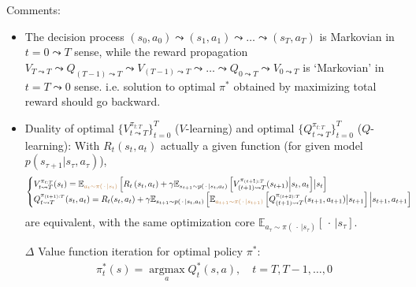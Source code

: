 Comments:
\begin{itemize}[topsep=2pt,itemsep=0pt]
    \item The decision process $(s_0,a_0)\leadsto (s_1,a_1)\leadsto\ldots\leadsto (s_T,a_T) $
    is Markovian in $ t=0\leadsto T $ sense, while the reward propagation $ V_{T\leadsto T}\leadsto Q_{(T-1)\leadsto T}\leadsto V_{(T-1)\leadsto T}\leadsto \ldots\leadsto Q_{0\leadsto T}\leadsto V_{0\leadsto T} $ is `Markovian' in $t= T\leadsto 0 $ sense. i.e. solution to optimal $ \pi^* $ obtained by maximizing total reward should go backward.
    \item Duality of optimal $ \{V_{t\leadsto T}^{\pi_{t:T}}\}_{t=0}^T $ ($ V $-learning) and optimal $ \{Q_{t\leadsto T}^{\pi_{t:T}}\}_{t=0}^{T} $ ($ Q $-learning): With $ R_{t}(s_t,a_t) $ actually a given function (for given model $ p(s_{\tau+1}|s_\tau,a_\tau) $),
    \begin{align}
        \begin{cases}
            V_{t\leadsto T}^{\pi_{t:T}}(s_t)={\mathbb{E}_{\color{brown}a_t\sim \pi(\, \cdot \, |s_t)}\left[{R_{t}\left(s_t,a_t\right)+  \gamma\mathbb{E}_{s_{t+1}\sim p\left(\, \cdot \, |s_t,a_t\right)}\left[{\color{black}  V_{(t+1)\leadsto T}^{\pi_{(t+1):T}} (s_{t+1})} \Big| s_t,a_t \right]}  \big|s_t\right]}\\
            Q_{t\leadsto T}^{\pi_{(t+1):T}}(s_t,a_t)=R_t(s_t,a_t)+\gamma \mathbb{E}_{s_{t+1}\sim p\left(\, \cdot \, |s_t,a_t\right)}\left[ \mathbb{E}_{\color{brown}a_{t+1}\sim \pi(\, \cdot \, |s_{t+1})}\left[ Q_{(t+1)\leadsto T}^{\pi_{(t+2):T}}(s_{t+1},a_{t+1})  \big|s_{t+1}\right]  \Big| s_{t+1},a_{t+1}\right]
        \end{cases} 
    \end{align}
    are equivalent, with the same optimization core $ \mathbb{E}_{a_\tau\sim\pi(\, \cdot \, |s_\tau)}\left[ \, \cdot \,  |s_\tau \right]  $. 
    \item[$ \Delta  $] Value function iteration for optimal policy $ \pi^* $:
    \begin{align}
        \pi^*_t(s)=\mathop{\arg\max}\limits_{a} Q_t^*(s,a) ,\quad t=T,T-1,\ldots,0
    \end{align}
    
\end{itemize}
